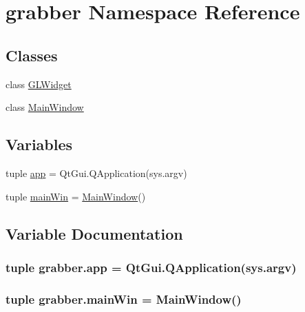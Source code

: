 \hypertarget{namespacegrabber}{}\section{grabber Namespace Reference}
\label{namespacegrabber}
\subsection*{Classes}
\begin{DoxyCompactItemize}
\item 
class \hyperlink{classgrabber_1_1GLWidget}{G\+L\+Widget}
\item 
class \hyperlink{classgrabber_1_1MainWindow}{Main\+Window}
\end{DoxyCompactItemize}
\subsection*{Variables}
\begin{DoxyCompactItemize}
\item 
tuple \hyperlink{namespacegrabber_a53f09eeb510103023680e57df9bc5c2c}{app} = Qt\+Gui.\+Q\+Application(sys.\+argv)
\item 
tuple \hyperlink{namespacegrabber_afda880b6f162b717ef0701045a437613}{main\+Win} = \hyperlink{classgrabber_1_1MainWindow}{Main\+Window}()
\end{DoxyCompactItemize}


\subsection{Variable Documentation}
\hypertarget{namespacegrabber_a53f09eeb510103023680e57df9bc5c2c}{}
\subsubsection[{app}]{\setlength{\rightskip}{0pt plus 5cm}tuple grabber.\+app = Qt\+Gui.\+Q\+Application(sys.\+argv)}\label{namespacegrabber_a53f09eeb510103023680e57df9bc5c2c}
\hypertarget{namespacegrabber_afda880b6f162b717ef0701045a437613}{}
\subsubsection[{main\+Win}]{\setlength{\rightskip}{0pt plus 5cm}tuple grabber.\+main\+Win = {\bf Main\+Window}()}\label{namespacegrabber_afda880b6f162b717ef0701045a437613}
